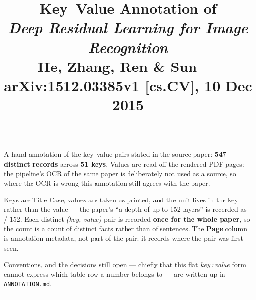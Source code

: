 \documentclass[10pt]{article}
\title{\textbf{Key--Value Annotation of}\\[0.25em]
       \emph{Deep Residual Learning for Image Recognition}\\[0.4em]
       {\normalsize He, Zhang, Ren \& Sun --- arXiv:1512.03385v1 [cs.CV], 10 Dec 2015}}
\author{}
\date{}
\newcommand{\usbreak}{\textunderscore\discretionary{}{}{}}
\newcommand{\K}[1]{\leavevmode{\color{keycol}\ttfamily\let\_\usbreak #1}}
\begin{document}
\maketitle
\vspace{-3.2em}

\noindent\rule{\textwidth}{0.4pt}
\vspace{0.4em}

\noindent
A hand annotation of the key--value pairs stated in the source paper:
\textbf{547 distinct records} across \textbf{51 keys}. Values are read off the
rendered PDF pages; the pipeline's OCR of the same paper is deliberately not
used as a source, so where the OCR is wrong this annotation still agrees with
the paper.

\medskip
\noindent
Keys are Title Case, values are taken as printed, and the unit lives in the key
rather than the value --- the paper's ``a depth of up to 152 layers'' is
recorded as \K{Depth} / 152. Each distinct \emph{(key, value)} pair is recorded
\textbf{once for the whole paper}, so the count is a count of distinct facts
rather than of sentences. The \textbf{Page} column is annotation metadata, not
part of the pair: it records where the pair was first seen.

\medskip
\noindent
Conventions, and the decisions still open --- chiefly that this flat
\emph{key\,:\,value} form cannot express which table row a number belongs
to --- are written up in \texttt{ANNOTATION.md}.

\medskip
\noindent\rule{\textwidth}{0.4pt}

\tableofcontents







\end{document}
